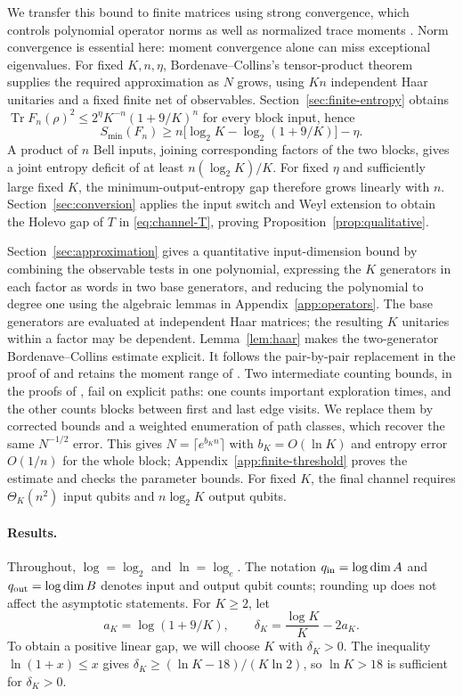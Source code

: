 \documentclass[11pt]{article}
\numberwithin{equation}{section}
\theoremstyle{boldremark}\newtheorem{remark}[theorem]{Remark}
\DeclareMathOperator{\Tr}{Tr}
\newcommand{\smin}{S_{\min}}
\begin{document}
We transfer this bound to finite matrices using strong convergence,
which controls polynomial operator norms as well as normalized trace
moments \cite{CM,BC}. Norm convergence is essential here: moment
convergence alone can miss exceptional eigenvalues.
For fixed $K,n,\eta$, Bordenave--Collins's tensor-product theorem
\cite[Theorem~9.2]{BC} supplies the required approximation as $N$
grows, using $Kn$ independent Haar unitaries and a fixed finite net
of observables. Section~\ref{sec:finite-entropy} obtains
$\Tr F_n(\rho)^2\le2^\eta K^{-n}(1+9/K)^n$ for every block input,
hence
\[
 \smin(F_n)\ge n\bigl[\log_2K-\log_2(1+9/K)\bigr]-\eta.
\]
A product of $n$ Bell inputs, joining corresponding factors of the
two blocks, gives a joint entropy deficit of at least
$n(\log_2K)/K$. For fixed $\eta$ and sufficiently large fixed $K$,
the minimum-output-entropy gap therefore grows linearly with $n$.
Section~\ref{sec:conversion} applies the input switch and Weyl extension
to obtain the Holevo gap of $T$ in \eqref{eq:channel-T}, proving
Proposition~\ref{prop:qualitative}.

Section~\ref{sec:approximation} gives a quantitative input-dimension bound
by combining the observable tests in one polynomial, expressing the
$K$ generators in each factor as words in two base generators, and
reducing the polynomial to degree one using the algebraic lemmas
in Appendix~\ref{app:operators}. The base generators are
evaluated at independent Haar matrices; the resulting $K$ unitaries
within a factor may be dependent. Lemma~\ref{lem:haar} makes the
two-generator Bordenave--Collins estimate explicit. It follows the
pair-by-pair replacement in the proof of \cite[Lemma~9.3]{BC} and
retains the moment range of \cite[Theorem~5.1]{BC}. Two intermediate
counting bounds, in the proofs of \cite[Lemmas~5.3 and~5.9]{BC}, fail
on explicit paths: one counts important exploration times, and the
other counts blocks between first and last edge visits. We replace
them by corrected bounds and a weighted enumeration of path classes,
which recover the same $N^{-1/2}$ error.
This gives $N=\lceil e^{b_Kn}\rceil$ with $b_K=O(\ln K)$ and entropy
error $O(1/n)$ for the whole block; Appendix~\ref{app:finite-threshold}
proves the estimate and checks the parameter bounds.
For fixed $K$, the final channel requires $\Theta_K(n^2)$ input
qubits and $n\log_2K$ output qubits.

\paragraph{Results.}
Throughout, $\log=\log_2$ and $\ln=\log_e$. The notation
$q_{\rm in}=\log\dim A$ and $q_{\rm out}=\log\dim B$ denotes input and
output qubit counts; rounding up does not affect the asymptotic statements.
For $K\ge2$, let
\begin{equation}
 a_K=\log(1+9/K),\qquad
 \delta_K=\frac{\log K}{K}-2a_K.
 \label{eq:delta}
\end{equation}
To obtain a positive linear gap, we will choose $K$ with $\delta_K>0$.
The inequality $\ln(1+x)\le x$ gives
$\delta_K\ge(\ln K-18)/(K\ln2)$, so $\ln K>18$ is sufficient
for $\delta_K>0$.
\end{document}
